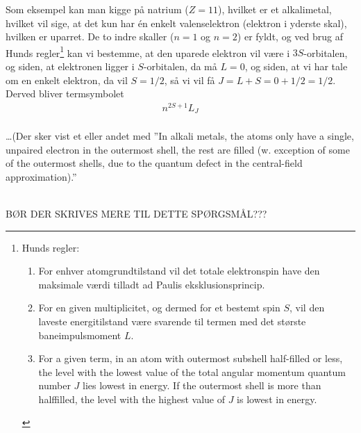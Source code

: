 Som eksempel kan man kigge på natrium ($Z=11$), hvilket er et alkalimetal, hvilket vil sige, at det kun har én enkelt valenselektron (elektron i yderste skal), hvilken er uparret. De to indre skaller ($n=1$ og $n=2$) er fyldt, og ved brug af Hunds regler\footnote{Hunds regler:
\begin{enumerate}
    \item For enhver atomgrundtilstand vil det totale elektronspin have den maksimale værdi tilladt ad Paulis eksklusionsprincip.
    \item For en given multiplicitet, og dermed for et bestemt spin $S$, vil den laveste energitilstand være svarende til termen med det største baneimpulsmoment $L$.
    \item For a given term, in an atom with outermost subshell half-filled or less, the level with the lowest value of the total angular momentum quantum number $J$ lies lowest in energy. If the outermost shell is more than halffilled, the level with the highest value of $J$ is lowest in energy.
\end{enumerate}
} kan vi bestemme, at den uparede elektron vil være i $3S$-orbitalen, og siden, at elektronen ligger i $S$-orbitalen, da må $L = 0$, og siden, at vi har tale om en enkelt elektron, da vil $S = 1/2$, så vi vil få $J = L + S = 0 + 1/2 = 1/2$. Derved bliver termsymbolet
\begin{align}
    n^{2S+1}L_J
\end{align}
$ $\\\\

\ldots (Der sker vist et eller andet med ''In alkali metals, the atoms only have a single, unpaired electron in the outermost shell, the rest are filled (w.
exception of some of the outermost shells, due to the quantum defect in the central-field approximation).''



$ $\\\\
BØR DER SKRIVES MERE TIL DETTE SPØRGSMÅL???